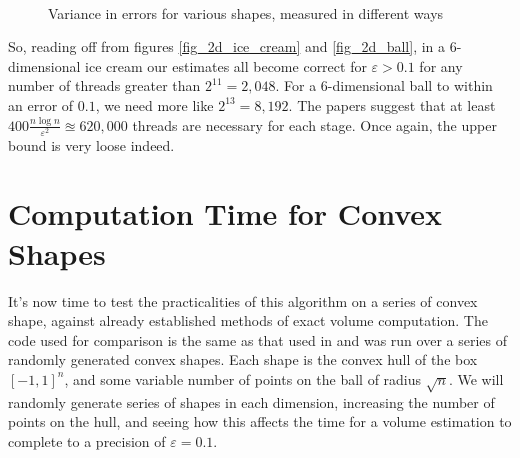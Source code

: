 \begin{figure}
\centering
{}
\\

\label{fig_histograms}
\caption{Variance in errors for various shapes, measured in different ways}
\end{figure}

So, reading off from figures \ref{fig_2d_ice_cream} and \ref{fig_2d_ball}, in a 6-dimensional ice cream our estimates all become correct for $\varepsilon > 0.1$ for any number of threads greater than $2^11 = 2,048$. For a 6-dimensional ball to within an error of $0.1$, we need more like $2^13 = 8,192$. The papers suggest that at least $400\frac{n\log n}{\varepsilon^2} \approxeq 620,000$ threads are necessary for each stage. Once again, the upper bound is very loose indeed.

\section{Computation Time for Convex Shapes}\label{sec_time}

It's now time to test the practicalities of this algorithm on a series of convex shape, against already established methods of exact volume computation. The code used for comparison is the same as that used in %
and was run over a series of randomly generated convex shapes. Each shape is the convex hull of the box $[-1,1]^n$, and some variable number of points on the ball of radius $\sqrt n$. We will randomly generate series of shapes in each dimension, increasing the number of points on the hull, and seeing how this affects the time for a volume estimation to complete to a precision of $\varepsilon = 0.1$.

